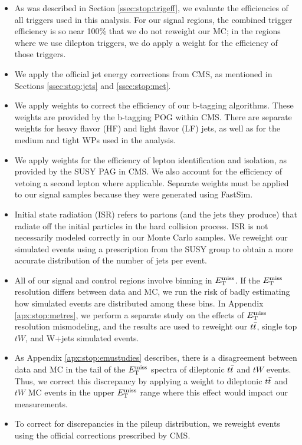 \begin{itemize}
\item As was described in Section \ref{ssec:stop:trigeff}, we evaluate
  the efficiencies of all triggers used in this analysis. For our
  signal regions, the combined trigger efficiency is so near 100\% that we
  do not reweight our MC; in the regions where we use dilepton
  triggers, we do apply a weight for the efficiency of those triggers.
\item We apply the official jet energy corrections from CMS, as mentioned in
  Sections \ref{ssec:stop:jets} and \ref{ssec:stop:met}.
\item We apply weights to correct the efficiency of our b-tagging
  algorithms. These weights are provided by the b-tagging POG within
  CMS. There are separate weights for heavy flavor (HF) and light
  flavor (LF) jets, as well as for the medium and tight WPs used in
  the analysis.
\item We apply weights for the efficiency of lepton identification and
  isolation, as provided by the SUSY PAG in CMS. We also account for
  the efficiency of vetoing a second lepton where applicable. Separate
  weights must be applied to our signal samples because they were
  generated using FastSim.
\item Initial state radiation (ISR) refers to partons (and the jets
  they produce) that radiate off the
  initial particles in the hard collision process. ISR is not
  necessarily modeled correctly in our Monte Carlo samples. We
  reweight our simulated events using a prescription from the SUSY
  group to obtain a more accurate distribution of the number of jets
  per event.
\item All of our signal and control regions involve binning in
  $E_\text{T}^\text{miss}$. If the $E_\text{T}^\text{miss}$ resolution differs between data and MC, we run
  the risk of badly estimating how simulated events are distributed
  among these bins. In Appendix
  \ref{apx:stop:metres}, we perform a separate study on the effects
  of $E_\text{T}^\text{miss}$ resolution mismodeling, and the results are used to
  reweight our $t\bar{t}$, single top $tW$, and W+jets simulated events.
\item As Appendix \ref{apx:stop:emustudies} describes, there is a disagreement
  between data and MC in the tail of the $E_\text{T}^\text{miss}$ spectra of dileptonic
  $t\bar{t}$ and $tW$ events. Thus, we correct this discrepancy by
  applying a weight to dileptonic $t\bar{t}$ and $tW$ MC
  events in the upper $E_\text{T}^\text{miss}$ range where this effect would impact our measurements.
\item To correct for discrepancies in the pileup distribution, we
  reweight events using the official corrections prescribed by CMS.
\end{itemize}

